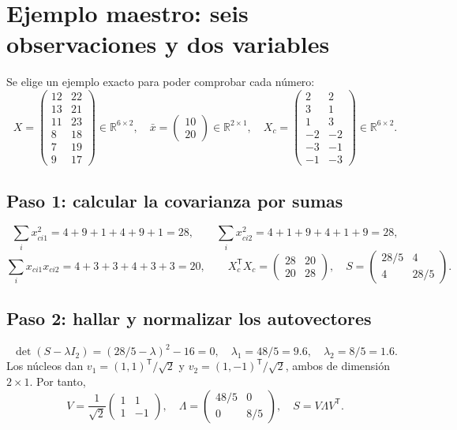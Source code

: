 \documentclass[11pt,a4paper]{article}
\newcommand{\R}{\mathbb R}
\newcommand{\T}{^{\mathsf T}}
\theoremstyle{definition}
\begin{document}
\section{Ejemplo maestro: seis observaciones y dos variables}
\label{sec:ejemplo2d}
Se elige un ejemplo exacto para poder comprobar cada número:
\[
X=\begin{pmatrix}12&22\\13&21\\11&23\\8&18\\7&19\\9&17\end{pmatrix}\in\R^{6\times2},\quad
\bar x=\begin{pmatrix}10\\20\end{pmatrix}\in\R^{2\times1},\quad
X_c=\begin{pmatrix}2&2\\3&1\\1&3\\-2&-2\\-3&-1\\-1&-3\end{pmatrix}\in\R^{6\times2}.
\]
\subsection{Paso 1: calcular la covarianza por sumas}
\[
\sum_i x_{ci1}^2=4+9+1+4+9+1=28,\qquad
\sum_i x_{ci2}^2=4+1+9+4+1+9=28,
\]
\[
\sum_i x_{ci1}x_{ci2}=4+3+3+4+3+3=20,\qquad
X_c\T X_c=\begin{pmatrix}28&20\\20&28\end{pmatrix},\quad
S=\begin{pmatrix}28/5&4\\4&28/5\end{pmatrix}.
\]
\subsection{Paso 2: hallar y normalizar los autovectores}
\[
\det(S-\lambda I_2)=(28/5-\lambda)^2-16=0,
\quad\lambda_1=48/5=9.6,\quad\lambda_2=8/5=1.6.
\]
Los núcleos dan $v_1=(1,1)\T/\sqrt2$ y $v_2=(1,-1)\T/\sqrt2$, ambos de dimensión $2\times1$. Por tanto,
\[
V=\frac1{\sqrt2}\begin{pmatrix}1&1\\1&-1\end{pmatrix},\quad
\Lambda=\begin{pmatrix}48/5&0\\0&8/5\end{pmatrix},\quad S=V\Lambda V\T.
\]
\end{document}
